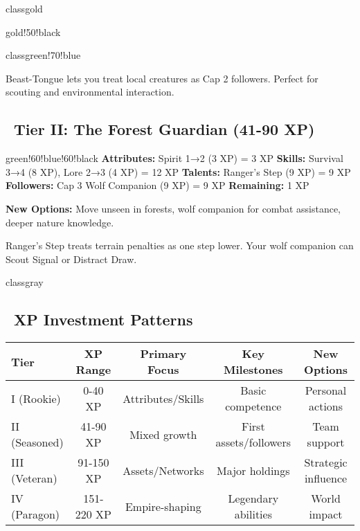 \documentclass[11pt]{article}
\begin{document}
\begin{classguide}{classgold}
\begin{tierbox}{gold!50!black}
\begin{classguide}{classgreen!70!blue}
\begin{tipbox}
Beast-Tongue lets you treat local creatures as Cap 2 followers. Perfect for scouting and environmental interaction.
\end{tipbox}

\subsection*{\faStar\faStar\ Tier II: The Forest Guardian (41-90 XP)}
\begin{tierbox}{green!60!blue!60!black}
\textbf{Attributes:} Spirit 1→2 (3 XP) = 3 XP
\textbf{Skills:} Survival 3→4 (8 XP), Lore 2→3 (4 XP) = 12 XP
\textbf{Talents:} Ranger's Step (9 XP) = 9 XP
\textbf{Followers:} Cap 3 Wolf Companion (9 XP) = 9 XP
\textbf{Remaining:} 1 XP
\end{tierbox}

\textbf{New Options:} Move unseen in forests, wolf companion for combat assistance, deeper nature knowledge.

\begin{tipbox}
Ranger's Step treats terrain penalties as one step lower. Your wolf companion can Scout Signal or Distract Draw.
\end{tipbox}
\end{classguide}

\newpage

\begin{classguide}{classgray}
\subsection*{\faChartLine\ XP Investment Patterns}

\begin{center}
\begin{tabular}{|l|c|c|c|c|}
\hline
\textbf{Tier} & \textbf{XP Range} & \textbf{Primary Focus} & \textbf{Key Milestones} & \textbf{New Options} \\
\hline
I (Rookie) & 0-40 XP & Attributes/Skills & Basic competence & Personal actions \\
II (Seasoned) & 41-90 XP & Mixed growth & First assets/followers & Team support \\
III (Veteran) & 91-150 XP & Assets/Networks & Major holdings & Strategic influence \\
IV (Paragon) & 151-220 XP & Empire-shaping & Legendary abilities & World impact \\
\hline
\end{tabular}
\end{center}


\end{classguide}
\end{tierbox}
\end{classguide}
\end{document}
